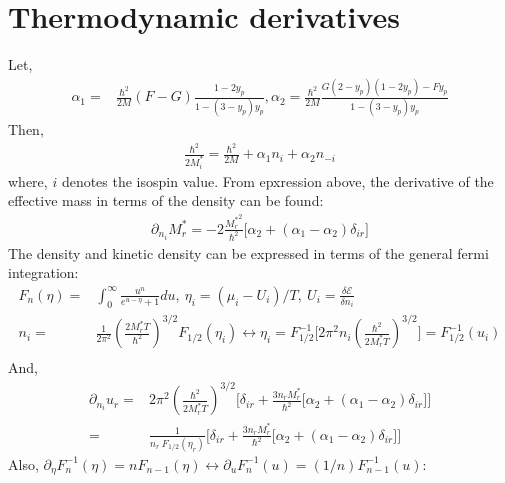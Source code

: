 \documentclass[preprint,prc,preprintnumbers,superscriptaddress,amsmath,amssymb,floatfix]{revtex4-1}
\begin{document}
\section{Thermodynamic derivatives}
Let,
\begin{equation}
 \begin{split}
  \alpha_1=&\frac{\hbar^2}{2M}(F-G)\frac{ 1-2 y_p}{ 1-(3-y_p) y_p}, \alpha_2 =\frac{\hbar^2}{2M} \frac{G (2-y_p) (1-2 y_p)-F y_p}{1-(3-y_p) y_p}
 \end{split}
\end{equation}
Then,
\begin{equation}
 \begin{split}
  \frac{\hbar^2}{2 M^{*}_i}=\frac{\hbar^2}{2 M}+\alpha_1 n_i+\alpha_2 n_{-i}
 \end{split}
\end{equation}
where, $i$ denotes the isospin value. From epxression above, the derivative of the effective mass in terms of the density can be found:
\begin{equation}
 \begin{split}
  \partial_{n_i}M^{*}_r=-2\frac{{M_r^{*}}^2}{\hbar^2}\big[\alpha_2+(\alpha_1-\alpha_2)\delta_{ir}\big]
 \end{split}
\end{equation}
The density and kinetic density can be expressed in terms of the general fermi integration:
\begin{equation}
 \begin{split}
  F_n(\eta)=&\int_0^{\infty}\frac{u^n}{e^{u-\eta}+1}du,\ \eta_i=(\mu_i-U_i)/T,\  U_i=\frac{\delta \mathcal{E}}{\delta n_i}\\
  n_i=&\frac{1}{2\pi^2}(\frac{2M_r^{*}T}{\hbar^2})^{3/2}F_{1/2}(\eta_i)\leftrightarrow   \eta_i= F^{-1}_{1/2}\big[2 \pi^2 n_i(\frac{\hbar^2}{2 M_r^{*}T})^{3/2}\big]=F^{-1}_{1/2}(u_i)\\
 \end{split}
\end{equation}
And,
\begin{equation}
 \begin{split}
  \partial_{n_i}u_r=&2\pi^2(\frac{\hbar^2}{2 M_r^{*}T})^{3/2}\Big[\delta_{ir}+\frac{3 n_r M_r^{*}}{\hbar^2}\big[\alpha_2+(\alpha_1-\alpha_2)\delta_{ir}\big]\Big]\\
  =&\frac{1}{n_r\ F_{1/2}(\eta_r)}\Big[\delta_{ir}+\frac{3 n_r M_r^{*}}{\hbar^2}\big[\alpha_2+(\alpha_1-\alpha_2)\delta_{ir}\big]\Big]
 \end{split}
\end{equation}
Also, $\partial_{\eta}F^{-1}_n(\eta)=nF_{n-1}(\eta) \leftrightarrow \partial_{u}F^{-1}_n(u)=(1/n)F^{-1}_{n-1}(u)$:
\end{document}
